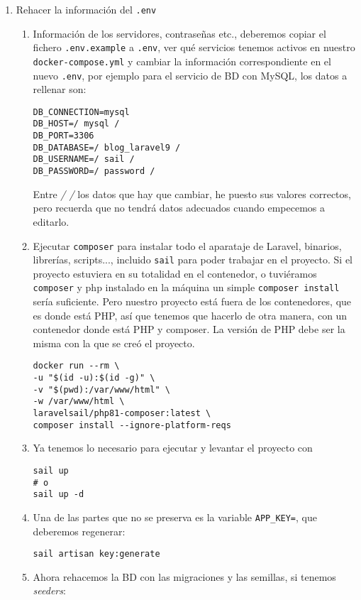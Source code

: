 \documentclass[11pt]{article}
\begin{document}
\begin{enumerate}
\item Rehacer la información del \texttt{.env}
\begin{enumerate}
\item Información de los servidores, contraseñas etc., deberemos
copiar el fichero \texttt{.env.example} a \texttt{.env}, ver qué servicios
tenemos activos en nuestro \texttt{docker-compose.yml} y cambiar la
información correspondiente en el nuevo \texttt{.env}, por ejemplo
para el servicio de BD con MySQL, los datos a rellenar son:
\begin{verbatim}
DB_CONNECTION=mysql
DB_HOST=/ mysql /
DB_PORT=3306
DB_DATABASE=/ blog_laravel9 /
DB_USERNAME=/ sail /
DB_PASSWORD=/ password /
\end{verbatim}
Entre \emph{/ /} los datos que hay que cambiar, he puesto sus
valores correctos, pero recuerda que no tendrá datos
adecuados cuando empecemos a editarlo.
\item Ejecutar \texttt{composer} para instalar todo el aparataje de
Laravel, binarios, librerías, scripts..., incluido \texttt{sail}
para poder trabajar en el proyecto. Si el proyecto estuviera
en su totalidad en el contenedor, o tuviéramos \texttt{composer} y
php instalado en la máquina un simple \texttt{composer install}
sería suficiente. Pero nuestro proyecto está fuera de los
contenedores, que es donde está PHP, así que tenemos que
hacerlo de otra manera, con un contenedor donde está PHP y
composer. La versión de PHP debe ser la misma con la que se
creó el proyecto.
\begin{verbatim}
docker run --rm \
-u "$(id -u):$(id -g)" \
-v "$(pwd):/var/www/html" \
-w /var/www/html \
laravelsail/php81-composer:latest \
composer install --ignore-platform-reqs
\end{verbatim}
\item Ya tenemos lo necesario para ejecutar y levantar el proyecto con
\begin{verbatim}
sail up
# o
sail up -d
\end{verbatim}
\item Una de las partes que no se preserva es la variable
\texttt{APP\_KEY=}, que deberemos regenerar:
\begin{verbatim}
sail artisan key:generate
\end{verbatim}
\item Ahora rehacemos la BD con las migraciones y las semillas, si
tenemos \emph{seeders}:
\begin{verbatim}

\end{verbatim}
\end{enumerate}
\end{enumerate}
\end{document}
